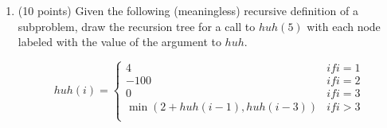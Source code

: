\documentclass[11pt]{article}
\begin{document}
\begin{enumerate}
\begin{enumerate}
    \begin{algo}
    Max(unimodal array $A$ of length $n$):\+\\
    \\
    \\
    \\
    \\
    \\
    \\
    \\
    \\
    \\
    \\
    \\
    \\
    \\
    \\
    \\
    \\
    \\
    \\
    \\
    \\
    \\
    \\
    \\
    \\
    \\
    \\
    \\
    \\
    \\
    \\
    \hspace{5in}

    \end{algo}
\end{enumerate}


\newpage

\begin{center}
\LARGE\textbf{Section 4 (1D Dynamic Programming)\\}%
\end{center}

\subsection*{Handwritten}
\item (10 points) Given the following (meaningless) recursive definition of a subproblem, draw the 
recursion tree for a call to $huh(5)$ with each node labeled with the value of the argument to $huh$.

\begin{equation*}
    huh(i) =
    \begin{cases}
        4 & if i = 1 \\
        -100 & if i = 2\\
        0 & if i = 3\\
        \min \left(2 + huh(i-1), huh(i-3)\right) & if i > 3 \\


\end{cases}
\end{equation*}
\end{enumerate}
\end{document}
